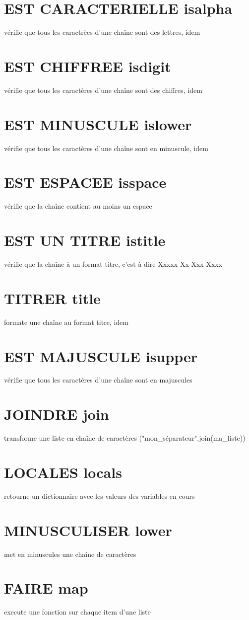 \documentclass{book}
\begin{document}
\section{EST CARACTERIELLE isalpha }
  vérifie que tous les caractrèes d'une chaîne sont des lettres, idem
\section{EST CHIFFREE isdigit }
  vérifie que tous les caractères d'une chaîne sont des chiffres, idem
\section{EST MINUSCULE islower }
  vérifie que tous les caractères d'une chaîne sont en minuscule, idem 
\section{EST ESPACEE isspace }
  vérifie que la chaîne contient au moins un espace
\section{EST UN TITRE istitle }
  vérifie que la chaîne à un format titre, c'est à dire Xxxxx Xx Xxx Xxxx 
\section{TITRER title }
  formate une chaîne au format titre, idem
\section{EST MAJUSCULE isupper }
  vérifie que tous les caractères d'une chaîne sont en majuscules 
\section{JOINDRE join }
  transforme une liste en chaîne de caractères ("mon\_séparateur".join(ma\_liste))
\section{LOCALES locals }
  retourne un dictionnaire avec les valeurs des variables en cours 
\section{MINUSCULISER lower }
  met en minuscules une chaîne de caractères
\section{FAIRE map }
  execute une fonction sur chaque item d'une liste
\end{document}
